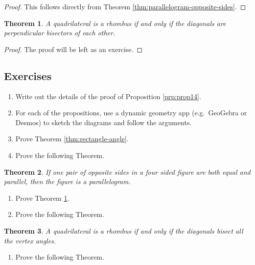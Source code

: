 \documentclass[
]{book}
\providecommand{\tightlist}{%
  \setlength{\itemsep}{0pt}\setlength{\parskip}{0pt}}
\newtheorem{theorem}{Theorem}[chapter]
\theoremstyle{definition}
\theoremstyle{definition}
\theoremstyle{definition}
\theoremstyle{definition}
\theoremstyle{remark}
\begin{document}
\begin{proof}
This follows directly from Theorem \ref{thm:parallelogram-opposite-sides}.
\end{proof}

\begin{theorem}
\protect\hypertarget{thm:rhombus-diagonals}{}\label{thm:rhombus-diagonals}A quadrilateral is a rhombus if and only if the diagonals are perpendicular bisectors of each other.
\end{theorem}

\begin{proof}
The proof will be left as an exercise.
\end{proof}

\hypertarget{exercises-39}{%
\subsection{Exercises}\label{exercises-39}}

\begin{enumerate}
\def\labelenumi{\arabic{enumi}.}
\item
  Write out the details of the proof of Proposition \ref{prp:prop14}.
\item
  For each of the propositions, use a dynamic geometry app (e.g.~GeoGebra or Desmos) to sketch the diagrams and follow the arguments.
\item
  Prove Theorem \ref{thm:rectangle-angle}.
\item
  Prove the following Theorem.
\end{enumerate}

\begin{theorem}
If one pair of opposite sides in a four sided figure are both equal and parallel, then the figure is a parallelogram.
\end{theorem}

\begin{enumerate}
\def\labelenumi{\arabic{enumi}.}
\setcounter{enumi}{4}
\item
  Prove Theorem \ref{thm:rhombus-diagonals}.
\item
  Prove the following Theorem.
\end{enumerate}

\begin{theorem}
A quadrilateral is a rhombus if and only if the diagonals bisect all the vertex angles.
\end{theorem}

\begin{enumerate}
\def\labelenumi{\arabic{enumi}.}
\setcounter{enumi}{6}
\tightlist
\item
  Prove the following Theorem.
\end{enumerate}
\end{document}
